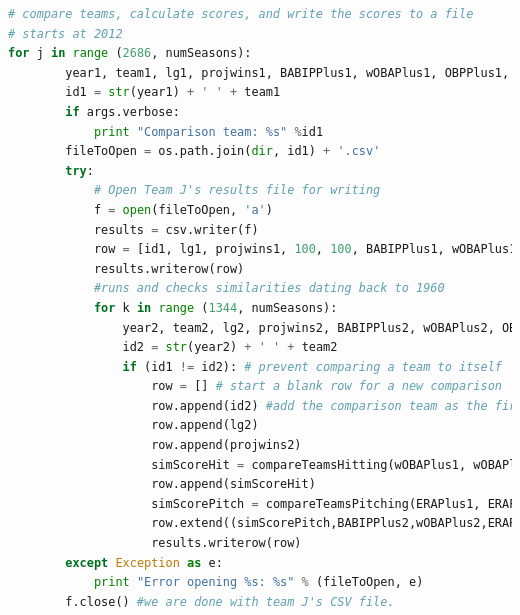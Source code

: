 \documentclass[12pt]{article}
\numberwithin{equation}{subsection}
\begin{document}
\begin{lstlisting}[language=Python, caption=Similarity Algorithm]
# compare teams, calculate scores, and write the scores to a file    
# starts at 2012
for j in range (2686, numSeasons):
        year1, team1, lg1, projwins1, BABIPPlus1, wOBAPlus1, OBPPlus1, SLGPlus1, KPPlus1, BBPPlus1, RPPlus1, HRPPlus1, SBCSRatePlus1, ERAPlus1, WHIPPlus1, HP9Plus1, BBP9Plus1, KP9Plus1, FIPPlus1, PBABIPPlus1, effERAPlus1, CGratePlus1 = getTeamInfo(years, teamNames, league, gamesPlayed, teamWins, R, AB, H, doubles, triples, HR, BB, SO, SB, CS, HBP, SF, ERA, IPouts, BBA, SOA, HRA, HA, CG, SHO, SV, FP, E, DP, BPF, PPF, ER, avg, j)
        id1 = str(year1) + ' ' + team1
        if args.verbose:
            print "Comparison team: %s" %id1
        fileToOpen = os.path.join(dir, id1) + '.csv'
        try:
            # Open Team J's results file for writing
            f = open(fileToOpen, 'a')
            results = csv.writer(f)
            row = [id1, lg1, projwins1, 100, 100, BABIPPlus1, wOBAPlus1, ERAPlus1, FIPPlus1, PBABIPPlus1, effERAPlus1]
            results.writerow(row)
            #runs and checks similarities dating back to 1960
            for k in range (1344, numSeasons):
                year2, team2, lg2, projwins2, BABIPPlus2, wOBAPlus2, OBPPlus2, SLGPlus2, KPPlus2, BBPPlus2, RPPlus2, HRPPlus2, SBCSRatePlus2, ERAPlus2, WHIPPlus2, HP9Plus2, BBP9Plus2, KP9Plus2, FIPPlus2, PBABIPPlus2, effERAPlus2, CGratePlus2 = getTeamInfo(years, teamNames, league, gamesPlayed, teamWins, R, AB, H, doubles, triples, HR, BB, SO, SB, CS, HBP, SF, ERA, IPouts, BBA, SOA, HRA, HA, CG, SHO, SV, FP, E, DP, BPF, PPF, ER, avg, k)
                id2 = str(year2) + ' ' + team2                
                if (id1 != id2): # prevent comparing a team to itself
                    row = [] # start a blank row for a new comparison
                    row.append(id2) #add the comparison team as the first column
                    row.append(lg2)
                    row.append(projwins2)
                    simScoreHit = compareTeamsHitting(wOBAPlus1, wOBAPlus2, BABIPPlus1, BABIPPlus2, OBPPlus1, OBPPlus2, SLGPlus1, SLGPlus2, RPPlus1, RPPlus2, KPPlus1, KPPlus2, BBPPlus1, BBPPlus2, HRPPlus1, HRPPlus2, SBCSRatePlus1, SBCSRatePlus2)
                    row.append(simScoreHit)
                    simScorePitch = compareTeamsPitching(ERAPlus1, ERAPlus2, FIPPlus1, FIPPlus2, WHIPPlus1, WHIPPlus2, KP9Plus1, KP9Plus2, BBP9Plus1, BBP9Plus2, HP9Plus1, HP9Plus2, PBABIPPlus1, PBABIPPlus2, effERAPlus1, effERAPlus2)
                    row.extend((simScorePitch,BABIPPlus2,wOBAPlus2,ERAPlus2,FIPPlus2,PBABIPPlus2,effERAPlus2))
                    results.writerow(row)
        except Exception as e:
            print "Error opening %s: %s" % (fileToOpen, e) 
        f.close() #we are done with team J's CSV file.  
\end{lstlisting}
\end{document}
